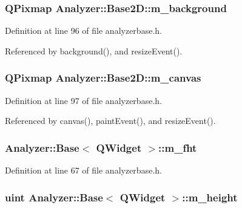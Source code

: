 \subsubsection{\setlength{\rightskip}{0pt plus 5cm}QPixmap {\bf Analyzer::Base2D::m\_\-background}\hspace{0.3cm}{\tt  [private]}}\label{classAnalyzer_1_1Base2D_Analyzer_1_1Base2Dr0}




Definition at line 96 of file analyzerbase.h.

Referenced by background(), and resize\-Event().
\subsubsection{\setlength{\rightskip}{0pt plus 5cm}QPixmap {\bf Analyzer::Base2D::m\_\-canvas}\hspace{0.3cm}{\tt  [private]}}\label{classAnalyzer_1_1Base2D_Analyzer_1_1Base2Dr1}




Definition at line 97 of file analyzerbase.h.

Referenced by canvas(), paint\-Event(), and resize\-Event().
\subsubsection{ {\bf Analyzer::Base}$<$ {\bf QWidget}  $>$::{\bf m\_\-fht}\hspace{0.3cm}{\tt  [protected, inherited]}}\label{classAnalyzer_1_1Base_Analyzer_1_1Basep3}




Definition at line 67 of file analyzerbase.h.
\subsubsection{\setlength{\rightskip}{0pt plus 5cm}uint {\bf Analyzer::Base}$<$ {\bf QWidget}  $>$::{\bf m\_\-height}\hspace{0.3cm}{\tt  [protected, inherited]}}\label{classAnalyzer_1_1Base_Analyzer_1_1Basep2}




